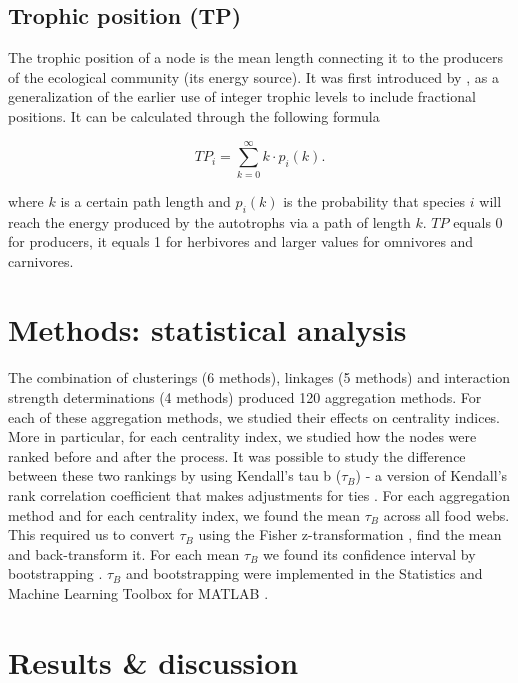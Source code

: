 \documentclass[twocolumn]{article}
\begin{document}
	\subsection*{Trophic position (TP)}

		The trophic position of a node is the mean length connecting it to the producers of the ecological community (its energy source). It was first introduced by \citet{Levine1980}, as a generalization of the earlier use of integer trophic levels to include fractional positions. It can be calculated through the following formula

						\begin{equation}
							TP_i=\sum\limits_{k=0}^\infty k \cdot p_i(k).
						\end{equation}

		\noindent where $k$ is a certain path length and $p_i(k)$ is the probability that species $i$ will reach the energy produced by the autotrophs via a path of length $k$. $TP$ equals 0 for producers, it equals 1 for herbivores and larger values for omnivores and carnivores.

\section*{Methods: statistical analysis}

	The combination of clusterings (6 methods), linkages (5 methods) and interaction strength determinations (4 methods) produced 120 aggregation methods. For each of these aggregation methods, we studied their effects on centrality indices. More in particular, for each centrality index, we studied how the nodes were ranked before and after the process. It was possible to study the difference between these two rankings by using Kendall's tau b ($\tau_B$) - a version of Kendall's rank correlation coefficient that makes adjustments for ties \citep{Agresti2012}. For each aggregation method and for each centrality index, we found the mean $\tau_B$ across all food webs. This required us to convert $\tau_B$ using the Fisher z-transformation \citep{Fisher1915}, find the mean and back-transform it. For each mean $\tau_B$ we found its confidence interval by bootstrapping \citep{DiCiccio1996}. $\tau_B$ and bootstrapping were implemented in the Statistics and Machine Learning Toolbox for MATLAB \citep{MathworksInc.2019}.

\section*{Results \& discussion}
\end{document}
